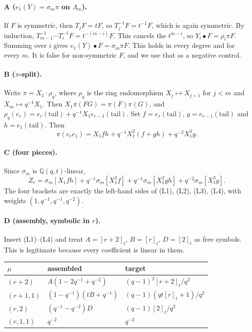 \documentclass[11pt]{article}
\newcommand{\tl}{\mathrm{tail}}
\newcommand{\tn}[1]{[#1]_t}
\begin{document}
\paragraph{A ($e_1(Y)=\sigma_m\pi$ on $\Lambda_m$).} If $F$ is symmetric, then $T_jF=tF$, so $T_j^{-1}F=t^{-1}F$, which is again symmetric. By induction, $T_{m-1}^{-1}\cdots T_i^{-1}F=t^{-(m-i)}F$. This cancels the $t^{m-i}$, so $Y_i\bullet F=\rho_i\pi F$. Summing over $i$ gives $e_1(Y)\bullet F=\sigma_m\pi F$. This holds in every degree and for every $m$. It is false for non-symmetric $F$, and we use that as a negative control.

\paragraph{B ($\pi$-split).} Write $\pi=X_1\cdot\rho_q$, where $\rho_q$ is the ring endomorphism $X_j\mapsto X_{j+1}$ for $j<m$ and $X_m\mapsto q^{-1}X_1$. Then $X_1\pi(FG)=\pi(F)\pi(G)$, and $\rho_q(e_r)=e_r(\tl)+q^{-1}X_1e_{r-1}(\tl)$. Set $f=e_r(\tl)$, $g=e_{r-1}(\tl)$ and $h=e_1(\tl)$. Then
\[
\pi(e_re_1)=X_1fh+q^{-1}X_1^2(f+gh)+q^{-2}X_1^3g.
\]

\paragraph{C (four pieces).} Since $\sigma_m$ is $\mathbb{Q}(q,t)$-linear,
\[
Z_r=\sigma_m[X_1fh]+q^{-1}\sigma_m[X_1^2f]+q^{-1}\sigma_m[X_1^2gh]+q^{-2}\sigma_m[X_1^3g].
\]
The four brackets are exactly the left-hand sides of (L1), (L2), (L3), (L4), with weights $(1,q^{-1},q^{-1},q^{-2})$.

\paragraph{D (assembly, symbolic in $r$).} Insert (L1)--(L4) and treat $A=\tn{r+2}$, $B=\tn{r}$, $D=\tn{2}$ as free symbols. This is legitimate because every coefficient is linear in them.
\begin{center}
\begin{tabular}{lll}
\toprule
$\mu$ & assembled & target \\
\midrule
$(r+2)$ & $A(1-2q^{-1}+q^{-2})$ & $(q-1)^2\tn{r+2}/q^2$\\
$(r+1,1)$ & $(1-q^{-1})(tB+q^{-1})$ & $(q-1)(qt\tn{r}+1)/q^2$\\
$(r,2)$ & $(q^{-1}-q^{-2})D$ & $(q-1)\tn{2}/q^2$\\
$(r,1,1)$ & $q^{-2}$ & $q^{-2}$\\
\bottomrule
\end{tabular}
\end{center}
\end{document}
